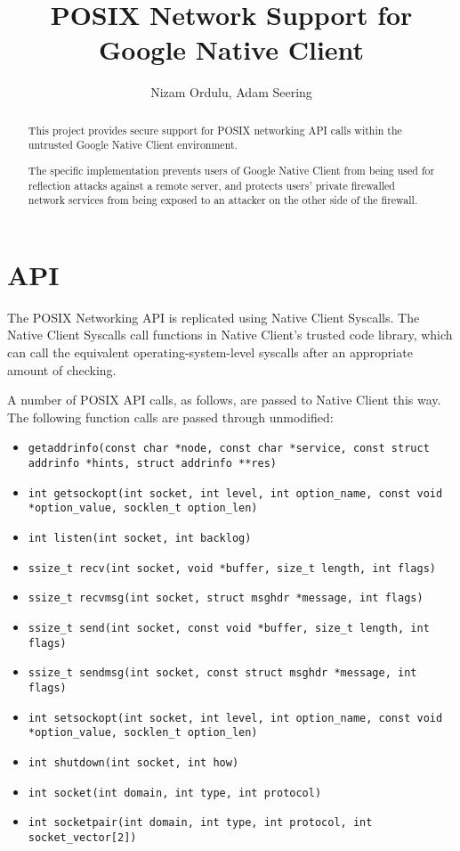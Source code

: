 \documentclass[a4paper,10pt]{article}
\title{POSIX Network Support for Google Native Client}
\author{Nizam Ordulu, Adam Seering}
\begin{document}
\maketitle

\begin{abstract}
This project provides secure support for POSIX networking API calls within the
untrusted Google Native Client environment.

The specific implementation prevents users of Google Native Client from being
used for reflection attacks against a remote server, and protects users'
private firewalled network services from being exposed to an attacker on the
other side of the firewall.
\end{abstract}

\section{API}

The POSIX Networking API is replicated using Native Client Syscalls.  The
Native Client Syscalls call functions in Native Client's trusted code library,
which can call the equivalent operating-system-level syscalls after an
appropriate amount of checking.

A number of POSIX API calls, as follows, are passed to Native Client this way.
The following function calls are passed through unmodified:

\begin{itemize}
\item \texttt{getaddrinfo(const char *node,
                const char *service,
                const struct addrinfo *hints,
                struct addrinfo **res)}
\item \texttt{int getsockopt(int socket, int level, int option\_name, const void
                *option\_value, socklen\_t option\_len)}
\item \texttt{int listen(int socket, int backlog)}
\item \texttt{ssize\_t recv(int socket, void *buffer, size\_t length, int
flags)}
\item \texttt{ssize\_t recvmsg(int socket, struct msghdr *message, int flags)}
\item \texttt{ssize\_t send(int socket, const void *buffer, size\_t length, int
flags)}
\item \texttt{ssize\_t sendmsg(int socket, const struct msghdr *message, int
flags)}
\item \texttt{int setsockopt(int socket, int level, int option\_name, const void
                *option\_value, socklen\_t option\_len)}
\item \texttt{int shutdown(int socket, int how)}
\item \texttt{int socket(int domain, int type, int protocol)}
\item \texttt{int socketpair(int domain, int type, int protocol,
       int socket\_vector[2])}
\end{itemize}
\end{document}
